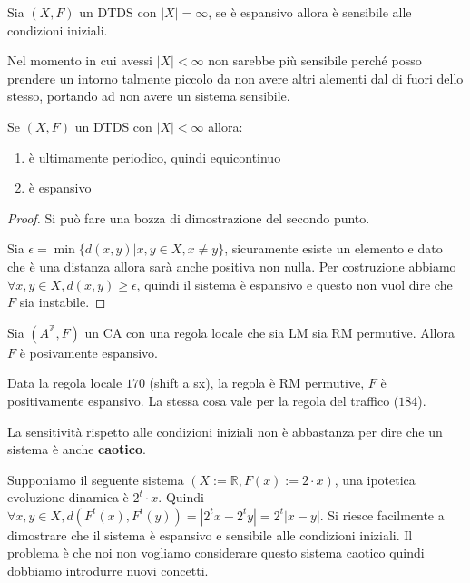 \begin{teorema}
    Sia $(X,F)$ un DTDS con $|X|=\infty$, se è espansivo allora è sensibile alle condizioni iniziali.

    Nel momento in cui avessi $|X|<\infty$ non sarebbe più sensibile perché posso
    prendere un intorno talmente piccolo da non avere altri alementi dal di fuori
    dello stesso, portando ad non avere un sistema sensibile.
\end{teorema}

\begin{nota}
    Se $(X,F)$ un DTDS con $|X|<\infty$ allora:
    \begin{enumerate}
        \item è ultimamente periodico, quindi equicontinuo
        \item è espansivo
    \end{enumerate}
    \begin{proof}
        Si può fare una bozza di dimostrazione del secondo punto.

        Sia $\epsilon = \min\{d(x,y)|x,y\in X, x\ne y\}$, sicuramente esiste un
        elemento e dato che è una distanza allora sarà anche positiva non nulla.
        Per costruzione abbiamo $\forall x,y\in X, d(x,y)\ge \epsilon$, quindi il
        sistema è espansivo e questo non vuol dire che $F$ sia instabile.
    \end{proof}
\end{nota}

\begin{teorema}
    Sia $(A^\mathbb{Z}, F)$ un CA con una regola locale  che sia LM sia RM permutive.
    Allora $F$ è posivamente espansivo.
\end{teorema}

\begin{esempio}
    Data la regola locale $170$ (shift a sx), la regola è RM permutive, $F$ è positivamente espansivo.
    La stessa cosa vale per la regola del traffico ($184$).
\end{esempio}

La sensitività rispetto alle condizioni iniziali non è abbastanza per dire che un
sistema è anche \textbf{caotico}.

\begin{esempio}
    Supponiamo il seguente sistema $(X:=\mathbb{R},F(x):= 2\cdot x)$, una ipotetica
    evoluzione dinamica è $2^t\cdot x$.
    Quindi $\forall x,y\in X, d(F^t(x),F^t(y)) = |2^tx-2^ty|= 2^t|x-y|$. Si riesce
    facilmente a dimostrare che il sistema è espansivo e sensibile alle condizioni
    iniziali. Il problema è che noi non vogliamo considerare questo sistema caotico
    quindi dobbiamo introdurre nuovi concetti.
\end{esempio}

